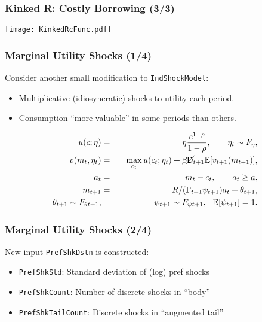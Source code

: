 \documentclass[11ptt]{beamer}
\newcommand{\bi}{\begin{itemize}}
\newcommand{\ei}{\end{itemize}}
\begin{document}
\begin{frame}
  \frametitle{Kinked R: Costly Borrowing (3/3)}
  \begin{center}
    \texttt{[image: KinkedRcFunc.pdf]}
  \end{center}
\end{frame}


\begin{frame}
  \frametitle{Marginal Utility Shocks (1/4)}
  Consider another small modification to \texttt{IndShockModel}:
  \bi
\item Multiplicative (idiosyncratic) shocks to utility each period.

\item Consumption ``more valuable'' in some periods than others.
  \ei
  \begin{eqnarray*}
    u(c;\eta) &=& \eta \frac{c^{1-\rho}}{1-\rho}, \qquad \eta_t \sim F_{\eta}, \\
    v(m_t,\eta_t) &=& \max_{c_t} u(c_t;\eta_t) + \beta \cancel{\mathsf{D}}_{t+1} \mathbb{E} [v_{t+1}(m_{t+1}) ], \\
    a_t &=& m_t - c_t, \qquad a_t \geq \underline{a}, \\
    m_{t+1} &=& R/(\Gamma_{t+1} \psi_{t+1}) a_t + \theta_{t+1}, \\
    \theta_{t+1} \sim F_{\theta t+1}, &\qquad& \psi_{t+1} \sim F_{\psi t+1}, \hspace{0.25cm} \mathbb{E}[\psi_{t+1}] = 1.
  \end{eqnarray*}
\end{frame}

\begin{frame}
  \frametitle{Marginal Utility Shocks (2/4)}
  New input \texttt{PrefShkDstn} is constructed:
  \begin{itemize}
  \item \texttt{PrefShkStd}: Standard deviation of (log) pref shocks

  \item \texttt{PrefShkCount}: Number of discrete shocks in ``body''

  \item \texttt{PrefShkTailCount}: Discrete shocks in ``augmented tail''
  \end{itemize}
\end{frame}
\end{document}
